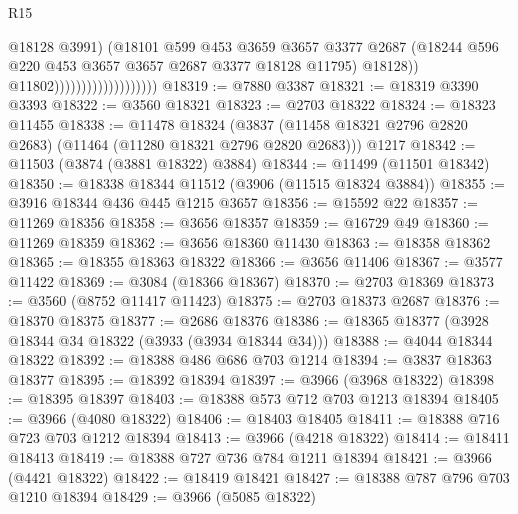 \begin{lexlean}{R15}
\begin{coremodule}
                                              @18128
                                              @3991)
                                            (@18101
                                              @599
                                              @453
                                              @3659
                                              @3657
                                              @3377
                                              @2687
                                              (@18244
                                                @596
                                                @220
                                                @453
                                                @3657
                                                @3657
                                                @2687
                                                @3377
                                                @18128
                                                @11795)
                                              @18128))
                                          @11802)))))))))))))))))))
@18319 := @7880 @3387
@18321 := @18319 @3390 @3393
@18322 := @3560 @18321
@18323 := @2703 @18322
@18324 := @18323 @11455
@18338 := @11478
    @18324
    (@3837 (@11458 @18321 @2796 @2820 @2683) (@11464 (@11280 @18321 @2796 @2820 @2683)))
    @1217
@18342 := @11503 (@3874 (@3881 @18322) @3884)
@18344 := @11499 (@11501 @18342)
@18350 := @18338 @18344 @11512 (@3906 (@11515 @18324 @3884))
@18355 := @3916 @18344 @436 @445 @1215 @3657
@18356 := @15592 @22
@18357 := @11269 @18356
@18358 := @3656 @18357
@18359 := @16729 @49
@18360 := @11269 @18359
@18362 := @3656 @18360 @11430
@18363 := @18358 @18362
@18365 := @18355 @18363 @18322
@18366 := @3656 @11406
@18367 := @3577 @11422
@18369 := @3084 (@18366 @18367)
@18370 := @2703 @18369
@18373 := @3560 (@8752 @11417 @11423)
@18375 := @2703 @18373 @2687
@18376 := @18370 @18375
@18377 := @2686 @18376
@18386 := @18365 @18377 (@3928 @18344 @34 @18322 (@3933 (@3934 @18344 @34)))
@18388 := @4044 @18344 @18322
@18392 := @18388 @486 @686 @703 @1214
@18394 := @3837 @18363 @18377
@18395 := @18392 @18394
@18397 := @3966 (@3968 @18322)
@18398 := @18395 @18397
@18403 := @18388 @573 @712 @703 @1213 @18394
@18405 := @3966 (@4080 @18322)
@18406 := @18403 @18405
@18411 := @18388 @716 @723 @703 @1212 @18394
@18413 := @3966 (@4218 @18322)
@18414 := @18411 @18413
@18419 := @18388 @727 @736 @784 @1211 @18394
@18421 := @3966 (@4421 @18322)
@18422 := @18419 @18421
@18427 := @18388 @787 @796 @703 @1210 @18394
@18429 := @3966 (@5085 @18322)

\end{coremodule}
\end{lexlean}
